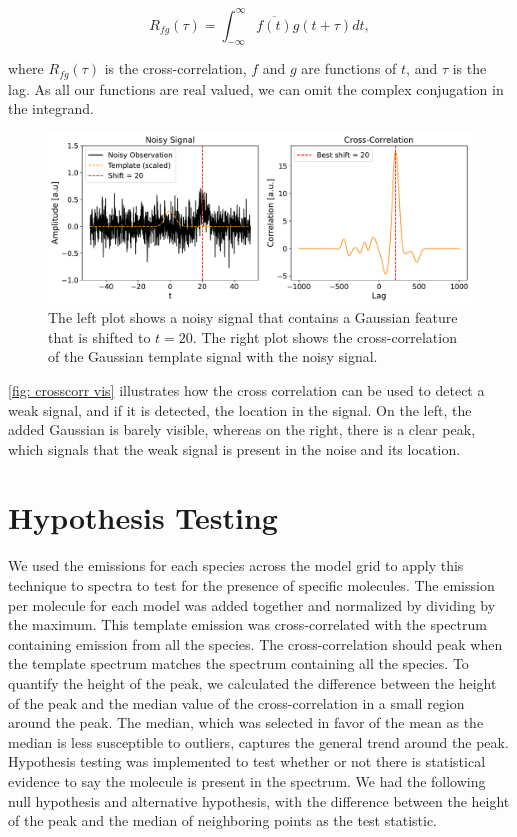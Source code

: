 \documentclass[oneside, single, authoryear, semicolon, 12pt]{lion-msc}
\newcommand{\4}{$_4$}
\newcommand{\3}{$_3$}
\newcommand{\2}{$_2$}
\begin{document}
\begin{equation}
    R_{fg}(\tau)=\int^\infty_{-\infty}\overline{f(t)}g(t+\tau)dt,
\end{equation}

where $R_{fg}(\tau)$ is the cross-correlation, $f$ and $g$ are functions of $t$, and $\tau$ is the lag. As all our functions are real valued, we can omit the complex conjugation in the integrand.

\begin{figure}[H]
    \centering
    \includegraphics[width=\linewidth]{Figures/Correlationexample.pdf}
    \caption{The left plot shows a noisy signal that contains a Gaussian feature that is shifted to $t=20$. The right plot shows the cross-correlation of the Gaussian template signal with the noisy signal.}
    \label{fig: crosscorr vis}
\end{figure}

\autoref{fig: crosscorr vis} illustrates how the cross correlation can be used to detect a weak signal, and if it is detected, the location in the signal. On the left, the added Gaussian is barely visible, whereas on the right, there is a clear peak, which signals that the weak signal is present in the noise and its location.

\section{Hypothesis Testing}
We used the emissions for each species across the model grid to apply this technique to spectra to test for the presence of specific molecules. The emission per molecule for each model was added together and normalized by dividing by the maximum. This template emission was cross-correlated with the spectrum containing emission from all the species. The cross-correlation should peak when the template spectrum matches the spectrum containing all the species. To quantify the height of the peak, we calculated the difference between the height of the peak and the median value of the cross-correlation in a small region around the peak. The median, which was selected in favor of the mean as the median is less susceptible to outliers, captures the general trend around the peak. Hypothesis testing was implemented to test whether or not there is statistical evidence to say the molecule is present in the spectrum. We had the following null hypothesis and alternative hypothesis, with the difference between the height of the peak and the median of neighboring points as the test statistic.
\end{document}
